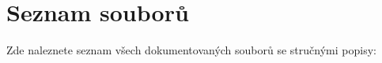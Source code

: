 \section{Seznam souborů}
Zde naleznete seznam všech dokumentovaných souborů se stručnými popisy\-:\begin{DoxyCompactList}
\item{}
\end{DoxyCompactList}
